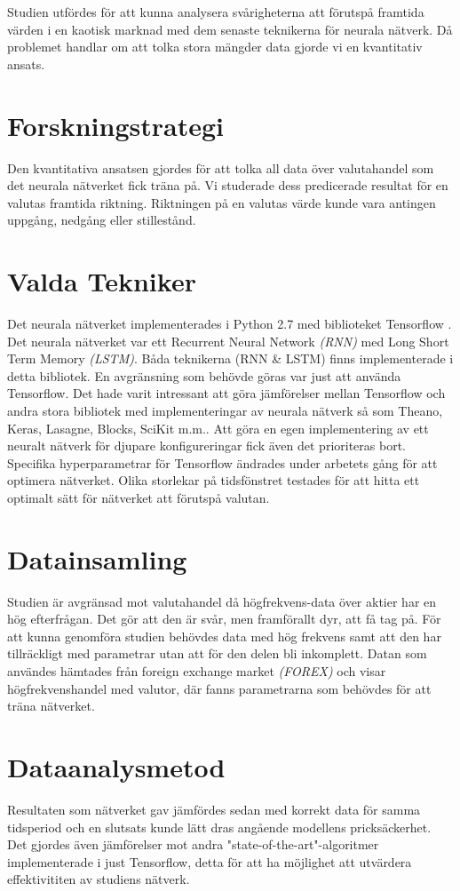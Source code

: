 Studien utfördes för att kunna analysera svårigheterna att förutspå framtida värden i en kaotisk marknad med dem senaste teknikerna för neurala nätverk. Då problemet handlar om att tolka stora mängder data gjorde vi en kvantitativ ansats. 

\section{Forskningstrategi} 
Den kvantitativa ansatsen gjordes för att tolka all data över valutahandel som det neurala nätverket fick träna på. Vi studerade dess predicerade resultat för en valutas framtida riktning. Riktningen på en valutas värde kunde vara antingen uppgång, nedgång eller stillestånd. 

\section{Valda Tekniker} 
Det neurala nätverket implementerades i Python 2.7 med biblioteket Tensorflow \citep{tensorflow2015-whitepaper}. Det neurala nätverket var ett Recurrent Neural Network \textit{(RNN)} med Long Short Term Memory \textit{(LSTM)}. Båda teknikerna (RNN \& LSTM) finns implementerade i detta bibliotek. En avgränsning som behövde göras var just att använda Tensorflow. Det hade varit intressant att göra jämförelser mellan Tensorflow och andra stora bibliotek med implementeringar av neurala nätverk så som Theano, Keras, Lasagne, Blocks, SciKit m.m.. Att göra en egen implementering av ett neuralt nätverk för djupare konfigureringar fick även det prioriteras bort. Specifika hyperparametrar för Tensorflow ändrades under arbetets gång för att optimera nätverket. Olika storlekar på tidsfönstret testades för att hitta ett optimalt sätt för nätverket att förutspå valutan. 

\section{Datainsamling} 
Studien är avgränsad mot valutahandel då högfrekvens-data över aktier har en hög efterfrågan. Det gör att den är svår, men framförallt dyr, att få tag på. För att kunna genomföra studien behövdes data med hög frekvens samt att den har tillräckligt med parametrar utan att för den delen bli inkomplett. Datan som användes hämtades från foreign exchange market \textit{(FOREX)} och visar högfrekvenshandel med valutor, där fanns parametrarna som behövdes för att träna nätverket. 

\section{Dataanalysmetod} 
Resultaten som nätverket gav jämfördes sedan med korrekt data för samma tidsperiod och en slutsats kunde lätt dras angående modellens pricksäckerhet. Det gjordes även jämförelser mot andra "state-of-the-art"-algoritmer implementerade i just Tensorflow, detta för att ha möjlighet att utvärdera effektivititen av studiens nätverk. 
